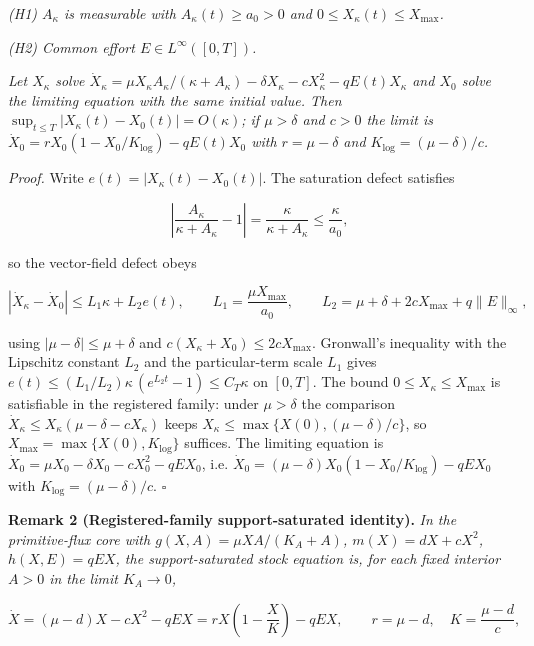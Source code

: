 \documentclass[11pt]{article}
\begin{document}
\emph{(H1) \(A_\kappa\) is measurable with \(A_\kappa(t) \ge a_0 > 0\) and \(0 \le X_\kappa(t) \le X_{\max}\).}

\emph{(H2) Common effort \(E \in L^\infty([0,T])\).}

\emph{Let \(X_\kappa\) solve \(\dot X_\kappa =\allowbreak{} \mu X_\kappa A_\kappa/(\kappa +\allowbreak{} A_\kappa) - \delta X_\kappa - cX_\kappa^2 - qE(t)X_\kappa\) and \(X_0\) solve the limiting equation with the same initial value. Then \(\sup_{t \le T} |X_\kappa(t) - X_0(t)| =\allowbreak{} O(\kappa)\); if \(\mu > \delta\) and \(c > 0\) the limit is \(\dot X_0 =\allowbreak{} rX_0(1 - X_0/\allowbreak{}K_{\log}) - qE(t)X_0\) with \(r = \mu - \delta\) and \(K_{\log} = (\mu - \delta)/c\).}

\emph{Proof.} Write \(e(t) = |X_\kappa(t) - X_0(t)|\). The saturation defect satisfies 

$$\left| \frac{A_\kappa}{\kappa + A_\kappa} - 1 \right| = \frac{\kappa}{\kappa + A_\kappa} \le \frac{\kappa}{a_0},$$

 so the vector-field defect obeys 

$$|\dot X_\kappa - \dot X_0| \le L_1 \kappa + L_2 e(t), \qquad L_1 = \frac{\mu X_{\max}}{a_0}, \qquad L_2 = \mu + \delta + 2cX_{\max} + q\|E\|_\infty,$$

 using \(|\mu - \delta| \le \mu +\allowbreak{} \delta\) and \(c(X_\kappa +\allowbreak{} X_0) \le 2cX_{\max}\). Gronwall's inequality with the Lipschitz constant \(L_2\) and the particular-term scale \(L_1\) gives \(e(t) \le (L_1/\allowbreak{}L_2)\kappa\,\allowbreak{}(e^{L_2 t} - 1) \le C_T \kappa\) on \([0,T]\). The bound \(0 \le X_\kappa \le X_{\max}\) is satisfiable in the registered family: under \(\mu > \delta\) the comparison \(\dot X_\kappa \le X_\kappa(\mu - \delta - cX_\kappa)\) keeps \(X_\kappa \le \max\{X(0),\allowbreak{} (\mu-\delta)/c\}\), so \(X_{\max} =\allowbreak{} \max\{X(0),\allowbreak{} K_{\log}\}\) suffices. The limiting equation is \(\dot X_0 =\allowbreak{} \mu X_0 - \delta X_0 - cX_0^2 - qE X_0\), i.e. \(\dot X_0 =\allowbreak{} (\mu - \delta)X_0 (1 - X_0/\allowbreak{}K_{\log}) - qE X_0\) with \(K_{\log} = (\mu - \delta)/c\). \(\square\)

\textbf{Remark 2 (Registered-family support-saturated identity).} \emph{In the primitive-flux core with \(g(X,A) = \mu XA/(K_A + A)\), \(m(X) = dX + cX^2\), \(h(X,E) = qEX\), the support-saturated stock equation is, for each fixed interior \(A > 0\) in the limit \(K_A \to 0\),} 

$$\dot X = (\mu - d)X - cX^2 - qEX = rX\left(1 - \frac{X}{K}\right) - qEX, \qquad r = \mu - d, \quad K = \frac{\mu - d}{c},$$
\end{document}
